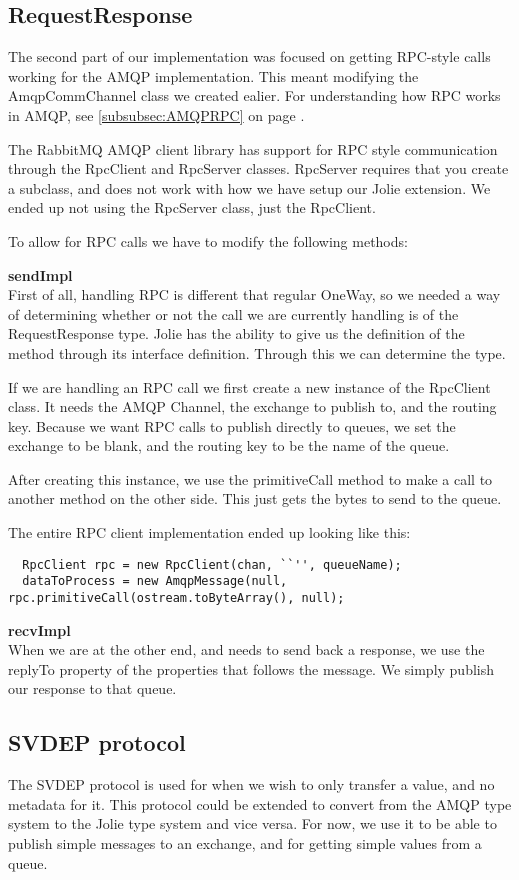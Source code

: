 \subsection{RequestResponse}
The second part of our implementation was focused on getting RPC-style calls working for the AMQP implementation. This meant modifying the AmqpCommChannel class we created ealier. For understanding how RPC works in AMQP, see \ref{subsubsec:AMQPRPC} on page \pageref{subsubsec:AMQPRPC}.

The RabbitMQ AMQP client library has support for RPC style communication through the RpcClient and RpcServer classes. RpcServer requires that you create a subclass, and does not work with how we have setup our Jolie extension. We ended up not using the RpcServer class, just the RpcClient.

To allow for RPC calls we have to modify the following methods:

\noindent\textbf{sendImpl}\\
First of all, handling RPC is different that regular OneWay, so we needed a way of determining whether or not the call we are currently handling is of the RequestResponse type. Jolie has the ability to give us the definition of the method through its interface definition. Through this we can determine the type.

If we are handling an RPC call we first create a new instance of the RpcClient class. It needs the AMQP Channel, the exchange to publish to, and the routing key. Because we want RPC calls to publish directly to queues, we set the exchange to be blank, and the routing key to be the name of the queue.

After creating this instance, we use the primitiveCall method to make a call to another method on the other side. This just gets the bytes to send to the queue.

The entire RPC client implementation ended up looking like this:
\begin{lstlisting}
  RpcClient rpc = new RpcClient(chan, ``'', queueName);
  dataToProcess = new AmqpMessage(null, rpc.primitiveCall(ostream.toByteArray(), null);
\end{lstlisting}

\noindent\textbf{recvImpl}\\
When we are at the other end, and needs to send back a response, we use the replyTo property of the properties that follows the message. We simply publish our response to that queue.


\subsection{SVDEP protocol}
\label{subsec:SVDEP} %
The SVDEP protocol is used for when we wish to only transfer a value, and no metadata for it. This protocol could be extended to convert from the AMQP type system to the Jolie type system and vice versa. For now, we use it to be able to publish simple messages to an exchange, and for getting simple values from a queue.

